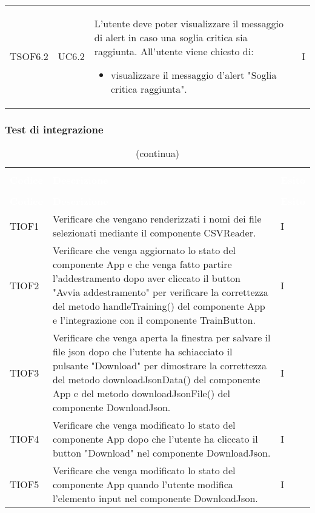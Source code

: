 \begin{longtable}{C{2.5cm} C{2.5cm} L{8cm} C{2cm}}
TSOF6.2 &
UC6.2 &
L'utente deve poter visualizzare il messaggio di alert in caso una soglia critica sia raggiunta. All'utente viene chiesto di:
\begin{itemize}
	\item visualizzare il messaggio d'alert "Soglia critica raggiunta".
\end{itemize}&
I \\

\end{longtable}

\subsubsection{Test di integrazione}

\begin{longtable}{C{2cm} L{8cm} C{2cm}}
\caption{Tabella dei test di integrazione} \\
\textcolor{white}{\textbf{Codice}} &
\textcolor{white}{\textbf{Descrizione}} &
\textcolor{white}{\textbf{Esito}} \\
		\endfirsthead
		\caption[]{(continua)} \\
\textcolor{white}{\textbf{Codice}} &
\textcolor{white}{\textbf{Descrizione}} &
\textcolor{white}{\textbf{Esito}} \\
		\endhead
TIOF1 & Verificare che vengano renderizzati i nomi dei file selezionati mediante il componente CSVReader. & I \\
TIOF2 & Verificare che venga aggiornato lo stato del componente App e che venga fatto partire l’addestramento dopo aver cliccato il button "Avvia addestramento" per verificare la correttezza del metodo handleTraining() del componente App e l’integrazione con il componente TrainButton. & I \\
TIOF3 & Verificare che venga aperta la finestra per salvare il file json dopo che l’utente ha schiacciato il pulsante "Download" per dimostrare la correttezza del metodo downloadJsonData() del componente App e del metodo downloadJsonFile() del componente DownloadJson. & I \\
TIOF4 & Verificare che venga modificato lo stato del componente App dopo che l’utente ha cliccato il button "Download" nel componente DownloadJson. & I \\
TIOF5 & Verificare che venga modificato lo stato del componente App quando l’utente modifica l’elemento input nel componente DownloadJson. & I \\

\end{longtable}
